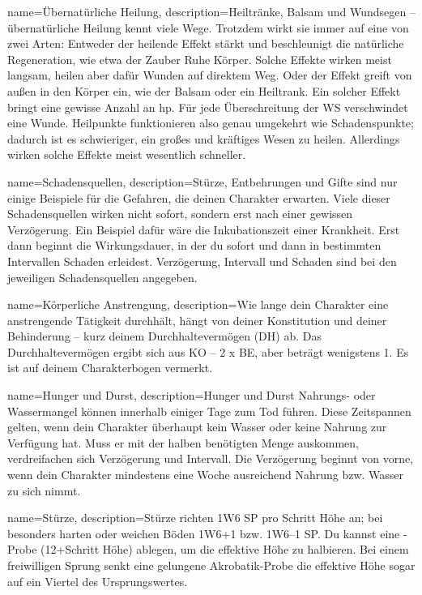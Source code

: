 {
    name={Übernatürliche Heilung},
    description={Heiltränke, Balsam und Wundsegen – übernatürliche Heilung kennt viele Wege. Trotzdem wirkt sie immer auf eine von zwei Arten: Entweder der heilende Effekt stärkt und beschleunigt die natürliche Regeneration, wie etwa der Zauber Ruhe Körper. Solche Effekte wirken meist langsam, heilen aber dafür Wunden auf direktem Weg. Oder der Effekt greift von außen in den Körper ein, wie der Balsam oder ein Heiltrank. Ein solcher Effekt bringt eine gewisse Anzahl an \gls{hp}. Für jede Überschreitung der WS verschwindet eine Wunde. Heilpunkte funktionieren also genau umgekehrt wie Schadenspunkte; dadurch ist es schwieriger, ein großes und kräftiges Wesen zu heilen. Allerdings wirken solche Effekte meist wesentlich schneller.}}

{
    name={Schadensquellen},
    description={Stürze, Entbehrungen und Gifte sind nur einige Beispiele für die Gefahren, die deinen Charakter erwarten. Viele dieser Schadensquellen wirken nicht sofort, sondern erst nach einer gewissen Verzögerung. Ein Beispiel dafür wäre die Inkubationszeit einer Krankheit. Erst dann beginnt die Wirkungsdauer, in der du sofort und dann in bestimmten Intervallen Schaden erleidest. Verzögerung, Intervall und Schaden sind bei den jeweiligen Schadensquellen angegeben.}}

{
    name={Körperliche Anstrengung},
    description={Wie lange dein Charakter eine anstrengende Tätigkeit durchhält, hängt von deiner Konstitution und deiner Behinderung – kurz deinem Durchhaltevermögen (DH) ab. Das Durchhaltevermögen ergibt sich aus KO – 2 x BE, aber beträgt wenigstens 1. Es ist auf deinem Charakterbogen vermerkt.}}

{
    name={Hunger und Durst},
    description={Hunger und Durst Nahrungs- oder Wassermangel können innerhalb einiger Tage zum Tod führen. Diese Zeitspannen gelten, wenn dein Charakter überhaupt kein Wasser oder keine Nahrung zur Verfügung hat. Muss er mit der halben benötigten Menge auskommen, verdreifachen sich Verzögerung und Intervall. Die Verzögerung beginnt von vorne, wenn dein Charakter mindestens eine Woche ausreichend Nahrung bzw. Wasser zu sich nimmt.}}

{
    name={Stürze},
    description={Stürze richten 1W6 SP pro Schritt Höhe an; bei besonders harten oder weichen Böden 1W6+1 bzw. 1W6–1 SP. Du kannst eine -Probe (12+Schritt Höhe) ablegen, um die effektive Höhe zu halbieren. Bei einem freiwilligen Sprung senkt eine gelungene Akrobatik-Probe die effektive Höhe sogar auf ein Viertel des Ursprungswertes.}}

